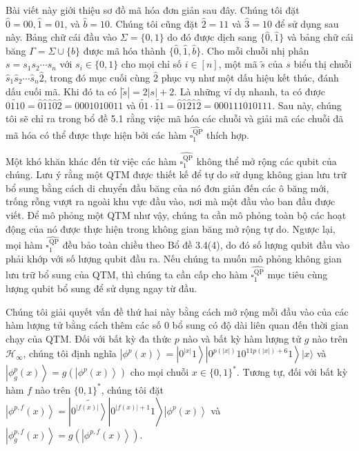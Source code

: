\documentclass[10pt]{article}
\begin{document}
Bài viết này giới thiệu sơ đồ mã hóa đơn giản sau đây. Chúng tôi đặt $\hat{0}=00, \hat{1}=01$, và $\hat{b}=10$. Chúng tôi cũng đặt $\hat{2}=11$ và $\hat{3}=10$ để sử dụng sau này. Bảng chữ cái đầu vào $\Sigma=\{0,1\}$ do đó được dịch sang $\{\hat{0}, \hat{1}\}$ và bảng chữ cái băng $\Gamma=\Sigma \cup\{b\}$ được mã hóa thành $\{\hat{0}, \hat{1}, \hat{b}\}$. Cho mỗi chuỗi nhị phân $s=s_{1} s_{2} \cdots s_{n}$ với $s_{i} \in\{0,1\}$ cho mọi chỉ số $i \in[n]$, một mã $\tilde{s}$ của $s$ biểu thị chuỗi $\hat{s}_{1} \hat{s}_{2} \cdots \hat{s}_{n} \hat{2}$, trong đó mục cuối cùng $\hat{2}$ phục vụ như một dấu hiệu kết thúc, đánh dấu cuối mã. Khi đó ta có $|\tilde{s}|=2|s|+2$. Là những ví dụ nhanh, ta có được $\widetilde{0110}=\hat{0} \hat{1} \hat{1} \hat{0} \hat{2}=0001010011$ và $\widetilde{01} \cdot \widetilde{11}=\hat{0} \hat{1} \hat{2} \hat{1} \hat{2}=000111010111$. Sau này, chúng tôi sẽ chỉ ra trong bổ đề 5.1 rằng việc mã hóa các chuỗi và giải mã các chuỗi đã mã hóa có thể được thực hiện bởi các hàm $\widehat{\square_{1}^{\mathrm{QP}}}$ thích hợp.

Một khó khăn khác đến từ việc các hàm $\widehat{\square_{1}^{\mathrm{QP}}}$ không thể mở rộng các qubit của chúng. Lưu ý rằng một QTM được thiết kế để tự do sử dụng không gian lưu trữ bổ sung bằng cách di chuyển đầu băng của nó đơn giản đến các ô băng mới, trống rỗng vượt ra ngoài khu vực đầu vào, nơi mà một đầu vào ban đầu được viết. Để mô phỏng một QTM như vậy, chúng ta cần mô phỏng toàn bộ các hoạt động của nó được thực hiện trong không gian băng mở rộng tự do. Ngược lại, mọi hàm $\widehat{\square_{1}^{\mathrm{QP}}}$ đều bảo toàn chiều theo Bổ đề 3.4(4), do đó số lượng qubit đầu vào phải khớp với số lượng qubit đầu ra. Nếu chúng ta muốn mô phỏng không gian lưu trữ bổ sung của QTM, thì chúng ta cần cấp cho hàm $\widehat{\square_{1}^{\mathrm{QP}}}$ mục tiêu cùng lượng qubit bổ sung để sử dụng ngay từ đầu.

Chúng tôi giải quyết vấn đề thứ hai này bằng cách mở rộng mỗi đầu vào của các hàm lượng tử bằng cách thêm các số 0 bổ sung có độ dài liên quan đến thời gian chạy của QTM. Đối với bất kỳ đa thức $p$ nào và bất kỳ hàm lượng tử $g$ nào trên $\mathcal{H}_{\infty}$, chúng tôi định nghĩa $\left|\phi^{p}(x)\right\rangle=\left|0^{|x|} 1\right\rangle\left|0^{p(|x|)} 10^{11 p(|x|)+6} 1\right\rangle|x\rangle$ và $\left|\phi_{g}^{p}(x)\right\rangle=g\left(\left|\phi^{p}(x)\right\rangle\right)$ cho mọi chuỗi $x \in\{0,1\}^{*}$. Tương tự, đối với bất kỳ hàm $f$ nào trên $\{0,1\}^{*}$, chúng tôi đặt $\left.\left|\phi^{p, f}(x)\right\rangle=\left|\widetilde{\left.0^{|f(x)|}\right\rangle}\right| 0^{|f(x)|+1} 1\right\rangle\left|\phi^{p}(x)\right\rangle$ và $\left|\phi_{g}^{p, f}(x)\right\rangle=g\left(\left|\phi^{p, f}(x)\right\rangle\right)$.
\end{document}
